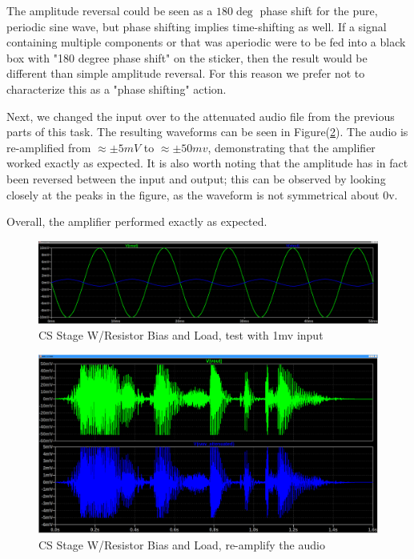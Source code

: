 \documentclass[11pt]{article}
\begin{document}
			The amplitude reversal could be seen as a $180\deg$ phase shift for the pure, periodic sine wave, but phase shifting implies time-shifting as well. If a signal containing multiple components or that was aperiodic were to be fed into a black box with "180 degree phase shift" on the sticker, then the result would be different than simple amplitude reversal. For this reason we prefer not to characterize this as a "phase shifting" action.
			
			Next, we changed the input over to the attenuated audio file from the previous parts of this task. The resulting waveforms can be seen in Figure(\ref{fig:T1_PF_WAV}). The audio is re-amplified from $\approx \pm 5mV$ to $\approx \pm 50mv$, demonstrating that the amplifier worked exactly as expected. It is also worth noting that the amplitude has in fact been reversed between the input and output; this can be observed by looking closely at the peaks in the figure, as the waveform is not symmetrical about 0v.
			
			Overall, the amplifier performed exactly as expected.
	\begin{figure}[h]
		\centering
		\includegraphics[width=0.95\linewidth]{task_1_e_waveform_av10}
		\caption{CS Stage W/Resistor Bias and Load, test with 1mv input}
		\label{fig:T1_PE_SIN}
		\vspace{1mm}
	\end{figure}

	\begin{figure}[h]
		\centering
		\includegraphics[width=0.95\linewidth]{task_1_f_amplify_the_attenuated_wav}
		\caption{CS Stage W/Resistor Bias and Load, re-amplify the audio}
		\label{fig:T1_PF_WAV}
		\vspace{1mm}
	\end{figure}
\end{document}
